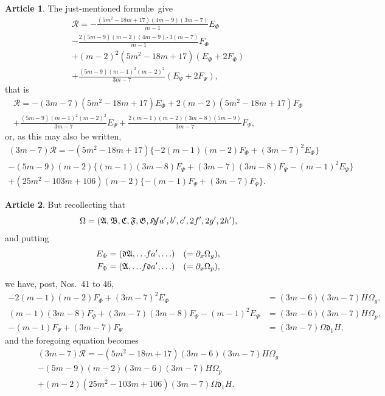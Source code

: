 \documentclass[12pt,a4paper]{article}
\theoremstyle{definition}
\newtheorem{art}{Article}[section]
\begin{document}
\begin{art}
The just-mentioned formul\ae\ give
\begin{multline*}
\mathcal{R} = -\frac{(5m^2 - 18m + 17)(4m - 9)(3m - 7)}{m - 1}E_\Phi \\
- \frac{2(5m - 9)(m - 2)(4m - 9) \cdot 3(m - 7)}{m - 1}F_\Phi \\
+ (m - 2)^2(5m^2 - 18m + 17)(E_\Phi + 2F_\Phi) \\
+ \frac{(5m - 9)(m - 1)^2(m - 2)^2}{3m - 7}(E_\Psi + 2F_\Psi),
\end{multline*}
that is
\begin{multline*}
\mathcal{R} = -(3m - 7)(5m^2 - 18m + 17)E_\Phi + 2(m - 2)(5m^2 - 18m + 17)F_\Phi \\
+ \frac{(5m - 9)(m - 1)^2(m - 2)^2}{3m - 7}E_\Psi + \frac{2(m - 1)(m - 2)(3m - 8)(5m - 9)}{3m - 7}F_\Psi,
\end{multline*}
or, as this may also be written,
\begin{multline*}
(3m - 7)\mathcal{R} = -(5m^2 - 18m + 17)\{-2(m - 1)(m - 2)F_\Phi + (3m - 7)^2E_\Phi\} \\
- (5m - 9)(m - 2)\{(m - 1)(3m - 8)F_\Psi + (3m - 7)(3m - 8)F_\Psi - (m - 1)^2E_\Psi\} \\
+ (25m^2 - 103m + 106)(m - 2)\{-(m - 1)F_\Psi + (3m - 7)F_\Psi\}.
\end{multline*}
\end{art}

\begin{art}
But recollecting that
\[
\Omega = (\mathfrak{A}, \mathfrak{B}, \mathfrak{C}, \mathfrak{F}, \mathfrak{G}, \mathfrak{H} \hspace{-2pt} fa', b', c', 2f', 2g', 2h'),
\]
and putting
\begin{align*}
E_\Phi &= (\mathfrak{d}\mathfrak{A}, \ldots \hspace{-2pt} fa', \ldots) \quad (= \partial_x\Omega_g), \\
F_\Phi &= (\mathfrak{A}, \ldots \hspace{-2pt} f\mathfrak{d}a', \ldots) \quad (= \partial_x\Omega_p),
\end{align*}
we have, post, Nos.\ 41 to 46,
\begin{align*}
-2(m - 1)(m - 2)F_\Phi + (3m - 7)^2E_\Phi &= (3m - 6)(3m - 7)H\Omega_g, \\
(m - 1)(3m - 8)F_\Psi + (3m - 7)(3m - 8)F_\Psi - (m - 1)^2E_\Psi &= (3m - 6)(3m - 7)H\Omega_p, \\
-(m - 1)F_\Psi + (3m - 7)F_\Psi &= (3m - 7)\Omega\mathfrak{d}_1 H,
\end{align*}
and the foregoing equation becomes
\begin{multline*}
(3m - 7)\mathcal{R} = -(5m^2 - 18m + 17)(3m - 6)(3m - 7)H\Omega_g \\
- (5m - 9)(m - 2)(3m - 6)(3m - 7)H\Omega_p \\
+ (m - 2)(25m^2 - 103m + 106)(3m - 7)\Omega\mathfrak{d}_1 H.
\end{multline*}
\end{art}
\end{document}
